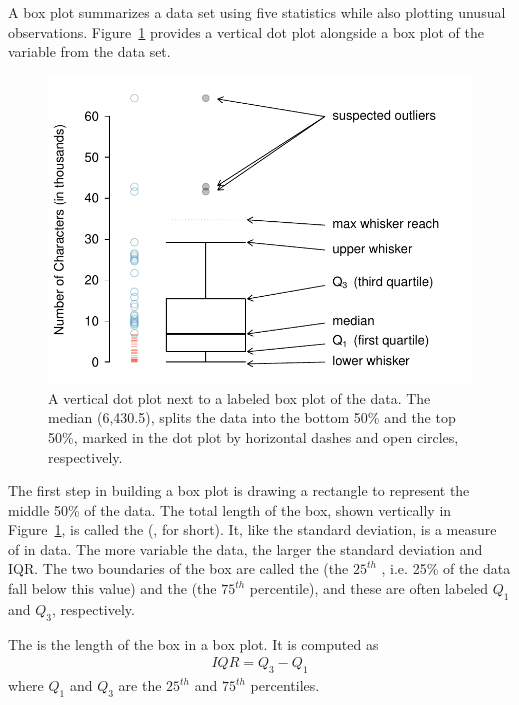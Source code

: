 A box plot summarizes a data set using five statistics while also plotting unusual observations. Figure~\ref{boxPlotLayoutNumVar} provides a vertical dot plot alongside a box plot of the  variable from the  data set.
\begin{figure}[h]
   \centering
   \includegraphics[width=\mycaptionwidth]{01/figures/boxPlotLayoutNumVar/boxPlotLayoutNumVar} %
   \caption{A vertical dot plot next to a labeled box plot of the  data. The median (6,430.5), splits the data into the bottom 50\% and the top 50\%, marked in the dot plot by horizontal dashes and open circles, respectively.}
   \label{boxPlotLayoutNumVar} %
\end{figure}

The first step in building a box plot is drawing a rectangle to represent the middle 50\% of the data. The total length of the box, shown vertically in Figure~\ref{boxPlotLayoutNumVar}, is called the  (, for short). It, like the standard deviation, is a measure of  in data. The more variable the data, the larger the standard deviation and IQR. The two boundaries of the box are called the  (the $25^{th}$ , i.e. 25\% of the data fall below this value) and the  (the $75^{th}$ percentile), and these are often labeled $Q_1$ and $Q_3$, respectively.

\begin{termBox}{
The  is the length of the box in a box plot. It is computed as
\begin{eqnarray*}
IQR = Q_3 - Q_1
\end{eqnarray*}
where $Q_1$ and $Q_3$ are the $25^{th}$ and $75^{th}$ percentiles.}
\end{termBox}

